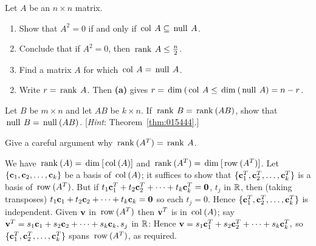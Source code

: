 {{\begin{multicols}{2}
\begin{ex}
\begin{sol}
\begin{enumerate}[label={\alph*.}]
\end{enumerate}
\end{sol}
\end{ex}

\begin{ex}
Let $A$ be an $n \times n$ matrix.

\begin{enumerate}[label={\alph*.}]
\item Show that $A^{2} = 0$ if and only if $\thinspace\operatorname{col\medspace} A \subseteq \thinspace\operatorname{null\medspace} A$.

\item Conclude that if $A^{2} = 0$, then $\thinspace\operatorname{rank\medspace} A \leq \tfrac{n}{2}$.

\item Find a matrix $A$ for which $\thinspace\operatorname{col\medspace} A = \thinspace\operatorname{null\medspace} A$.

\end{enumerate}
\begin{sol}
\begin{enumerate}[label={\alph*.}]
\setcounter{enumi}{1}
\item  Write $r = \thinspace\operatorname{rank\medspace} A$. Then \textbf{(a)} gives $r = \thinspace\operatorname{dim\medspace}(\thinspace\operatorname{col\medspace} A \leq \thinspace\operatorname{dim\medspace}(\thinspace\operatorname{null\medspace} A) = n - r$.

\end{enumerate}
\end{sol}
\end{ex}

\begin{ex}
Let $B$ be $m \times n$ and let $AB$ be $k \times n$. If $\thinspace\operatorname{rank\medspace} B = \thinspace\operatorname{rank\medspace}(AB)$, show that $\thinspace\operatorname{null\medspace} B = \thinspace\operatorname{null\medspace}(AB)$. [\textit{Hint}: Theorem~\ref{thm:015444}.]
\end{ex}

\begin{ex}
	\label{ex:5_4_12}
Give a careful argument why $\thinspace\operatorname{rank\medspace}(A^{T}) = \thinspace\operatorname{rank\medspace} A$.

\begin{sol}
We have $\thinspace\operatorname{rank\medspace}(A) = \thinspace\operatorname{dim\medspace}[\thinspace\operatorname{col\medspace}(A)]$ and $\thinspace\operatorname{rank\medspace}(A^T) = \thinspace\operatorname{dim\medspace}[\thinspace\operatorname{row\medspace}(A^T)]$. Let $\{\textbf{c}_1, \textbf{c}_2, \dots, \textbf{c}_k\}$ be a basis of $\thinspace\operatorname{col\medspace}(A)$; it suffices to show that $\{\textbf{c}_1^T, \textbf{c}_2^T, \dots, \textbf{c}_k^T\}$ is a basis of $\thinspace\operatorname{row\medspace}(A^T)$. But if $t_1\textbf{c}_1^T + t_2\textbf{c}_2^T + \dots + t_k\textbf{c}_k^T = \textbf{0}$, $t_j$ in $\mathbb{R}$, then (taking transposes) $t_1\textbf{c}_1 + t_2\textbf{c}_2 + \dots + t_k\textbf{c}_k = \textbf{0}$ so each $t_j = 0$. Hence $\{\textbf{c}_1^T, \textbf{c}_2^T, \dots, \textbf{c}_k^T\}$ is independent. Given $\textbf{v}$ in $\thinspace\operatorname{row\medspace}(A^T)$ then $\textbf{v}^T$ is in $\thinspace\operatorname{col\medspace}(A)$; say $\textbf{v}^T = s_1\textbf{c}_1 + s_2\textbf{c}_2 + \dots + s_k\textbf{c}_k, s_j $ in $\mathbb{R}$:
Hence $\textbf{v} = s_1\textbf{c}_1^T + s_2\textbf{c}_2^T + \dots + s_k\textbf{c}_k^T,$ so $\{\textbf{c}_1^T, \textbf{c}_2^T, \dots, \textbf{c}_k^T \}$ spans $\thinspace\operatorname{row\medspace}(A^T)$, as required.
\end{sol}
\end{ex}


\end{multicols}}}
